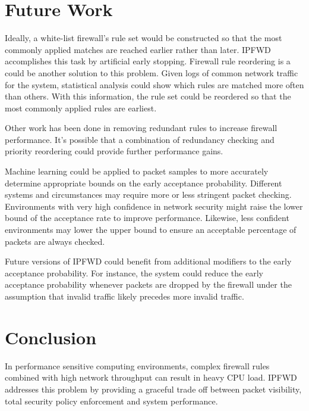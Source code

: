 \documentclass[journal]{IEEEtran}
\begin{document}
\section{Future Work}

  Ideally, a white-list firewall's rule set would be constructed so that the
  most commonly applied matches are reached earlier rather than later. IPFWD
  accomplishes this task by artificial early stopping. Firewall rule reordering
  is a could be another solution to this problem. Given logs of common network
  traffic for the system, statistical analysis could show which rules are
  matched more often than others. With this information, the rule set could be
  reordered so that the most commonly applied rules are earliest. 

  Other work \cite{redundancydetection} has been done in removing redundant
  rules to increase firewall performance. It's possible that a combination of
  redundancy checking and priority reordering could provide further performance
  gains.

  Machine learning could be applied to packet samples to more accurately
  determine appropriate bounds on the early acceptance probability. Different
  systems and circumstances may require more or less stringent packet checking.
  Environments with very high confidence in network security might raise the
  lower bound of the acceptance rate to improve performance. Likewise, less
  confident environments may lower the upper bound to ensure an acceptable
  percentage of packets are always checked.

  Future versions of IPFWD could benefit from additional modifiers to the early
  acceptance probability. For instance, the system could reduce the early
  acceptance probability whenever packets are dropped by the firewall under the
  assumption that invalid traffic likely precedes more invalid traffic.


\section{Conclusion}

  In performance sensitive computing environments, complex firewall rules
  combined with high network throughput can result in heavy CPU load. IPFWD
  addresses this problem by providing a graceful trade off between packet
  visibility, total security policy enforcement and system performance.
\end{document}
